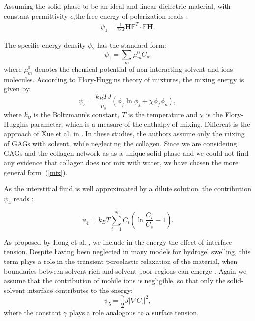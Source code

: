 \documentclass[runningheads]{llncs}
\newcommand{\F}{\ensuremath{\mathbb{F}}}
\begin{document}
Assuming the solid phase to be an ideal and linear dielectric material, with constant permittivity $\epsilon$,the free energy of polarization reads \cite{DROZDOV+,Reviewpolyel}:
\begin{gather}
\psi_1 = \frac{1}{2\epsilon J} \mathbf{H}\F^T \cdot \F \mathbf{H}.
\end{gather}

The specific energy density $\psi_2$ has the standard form:
\begin{equation}
\psi_1 = \sum\limits_{m} \mu^0_m C_m
\end{equation} 
where $\mu^0_m$ denotes the chemical potential of non interacting solvent and ions molecules. According to Flory-Huggins theory \cite{flory,hug} of mixtures, the mixing energy is given by:
\begin{equation}
\psi_3 = \frac{k_B T J}{v_s} \left(\phi_f \ln \phi_f + \chi \phi_f \phi_n\right),\label{mix}
\end{equation}
where $k_B$ is the Boltzmann's constant, $T$ is the temperature and $\chi$ is the Flory-Huggins parameter, which is a measure of the enthalpy of mixing. Different is the approach of Xue et al. in \cite{ecm1,ecm2}. In these studies, the authors assume only the mixing of GAGs with solvent, while neglecting the collagen. Since we are considering GAGs and the collagen network as as a unique solid phase and we could not find any evidence that collagen does not mix with water, we have chosen the more general form~(\ref{mix}).

As the interstitial fluid is well approximated by a dilute solution, the contribution $\psi_4$ reads \cite{Reviewpolyel,ecm1,ecm2}:

\begin{equation}
\psi_4 = k_B T \sum\limits_{i=1}^{N} C_i \left(\ln \frac{C_i}{ C_s}-1\right).
\end{equation}

As proposed by Hong et al. \cite{Interface}, we include in the energy the effect of interface tension. Despite having been neglected in many models for hydrogel swelling, this term plays a role in the transient poroelastic relaxation of the material, when boundaries between solvent-rich and solvent-poor regions can emerge \cite{sarah,Interface}. Again we assume that the contribution of mobile ions is negligible, so that only the solid-solvent interface contributes to the energy:
\begin{equation}
\psi_5 = \frac{\gamma}{2} J \left|\nabla C_s\right|^2,
\end{equation}
where the constant $\gamma$ plays a role analogous to a surface tension.
\end{document}
